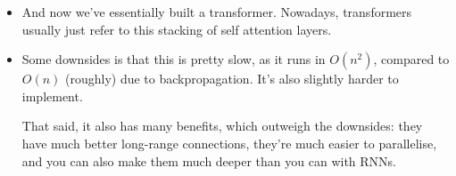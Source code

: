 \begin{itemize}
\begin{itemize}
		\end{itemize}
	\item And now we've essentially built a transformer. Nowadays, transformers
		usually just refer to this stacking of self attention layers. 
	\item Some downsides is that this is pretty slow, as it runs in \( O(n^2) \),
		compared to \( O(n) \) (roughly) due to backpropagation. It's also slightly
		harder to implement. 

		That said, it also has many benefits, which outweigh the downsides: they have
		much better long-range connections, they're much easier to parallelise, and
		you can also make them much deeper than you can with RNNs.  
\end{itemize}
